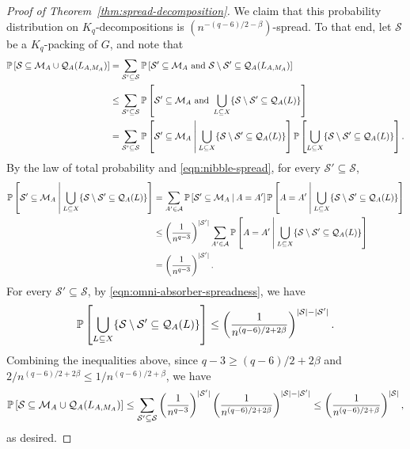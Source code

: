 \documentclass[11pt]{article}
\numberwithin{equation}{section}
\newcounter{i}
\theoremstyle{plain}
\theoremstyle{plain} %
\theoremstyle{definition}
\newcommand{\cA}{\mathcal{A}}
\newcommand{\cQ}{\mathcal{Q}}
\newcommand{\cM}{\mathcal{M}}
\newcommand{\cS}{\mathcal{S}}
\newcommand{\Prob}[1]{\ensuremath{%
\mathbb P\left[#1\right]
}}
\newcommand{\ProbCond}[2]{\ensuremath{%
    \mathbb P\left[#1\:\middle|\:#2\right]
  }}
\begin{document}
\begin{proof}[Proof of Theorem~\ref{thm:spread-decomposition}]
  We claim that this probability distribution on $K_q$-decompositions is $(n^{-(q-6)/2 - \beta})$-spread.  To that end, let $\cS$ be a $K_q$-packing of $G$, and note that
    \begin{align*}
        \Prob{\cS \subseteq \cM_A \cup \cQ_A(L_{A, M_A})} &= \sum_{\cS' \subseteq \cS}\Prob{\cS' \subseteq \cM_A \text{ and } \cS\setminus \cS'\subseteq \cQ_A(L_{A, M_A})}\\
        &\leq\sum_{\cS'\subseteq \cS}\Prob{\cS' \subseteq \cM_A \text{ and } 
      \bigcup_{L\subseteq X}\{\cS\setminus \cS' \subseteq \cQ_A(L)\}}\\
        &=\sum_{\cS' \subseteq \cS}\ProbCond{\cS' \subseteq \cM_A}{\bigcup_{L\subseteq X}\{\cS\setminus \cS' \subseteq \cQ_A(L)\}}\Prob{\bigcup_{L\subseteq X}\{\cS\setminus \cS' \subseteq \cQ_A(L)\}}.
    \end{align*}
    By the law of total probability and \eqref{eqn:nibble-spread}, for every $\cS' \subseteq \cS$,
    \begin{align*}
        \ProbCond{\cS' \subseteq \cM_A}{\bigcup_{L\subseteq X}\{\cS\setminus \cS' \subseteq \cQ_A(L)\}} &= \sum_{A'\in \cA}\ProbCond{\cS' \subseteq \cM_A}{A = A'}\ProbCond{A = A'}{\bigcup_{L\subseteq X}\{\cS\setminus \cS' \subseteq \cQ_A(L)\}}\\
        &\leq \left(\frac{1}{n^{q-3}}\right)^{|\cS'|} \sum_{A' \in \cA}\ProbCond{A = A'}{\bigcup_{L\subseteq X}\{\cS\setminus \cS' \subseteq \cQ_A(L)\}}\\
        &= \left(\frac{1}{n^{q-3}}\right)^{|\cS'|}.
    \end{align*}
    For every $\cS' \subseteq \cS$, by \eqref{eqn:omni-absorber-spreadness}, we have
    \begin{equation*}
        \Prob{\bigcup_{L\subseteq X}\{\cS\setminus \cS' \subseteq \cQ_A(L)\}} \leq \left(\frac{1}{n^{(q - 6)/2 + 2\beta}}\right)^{|\cS|-|\cS'|}.
    \end{equation*}
    Combining the inequalities above, since $q - 3 \geq (q - 6)/2 + 2\beta$ and $2/n^{(q-6)/2 + 2\beta} \leq 1/n^{(q-6)/2 + \beta}$, we have
    \begin{equation*}
        \Prob{\cS \subseteq \cM_A \cup \cQ_A(L_{A, M_A})} 
        \leq \sum_{\cS' \subseteq \cS}\left(\frac{1}{n^{q-3}}\right)^{|\cS'|}\left(\frac{1}{n^{(q - 6)/2 + 2\beta}}\right)^{|\cS|-|\cS'|} 
        \leq \left(\frac{1}{n^{(q - 6)/2 + \beta}}\right)^{|\cS|},
    \end{equation*}
    as desired.
\end{proof}
\end{document}
